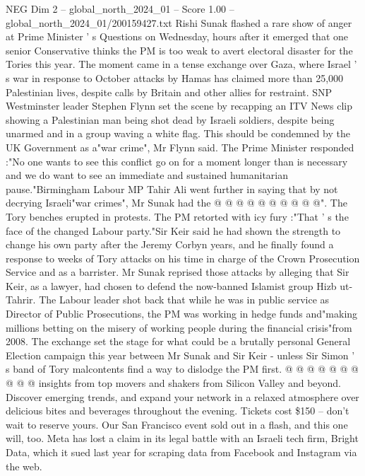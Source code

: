 \begin{textsample}{NEG Dim 2 – global\_north\_2024\_01 – Score 1.00 – global\_north\_2024\_01/200159427.txt}  \label{ex:f2_neg_244}
Rishi Sunak flashed a rare show of anger at Prime Minister ' s Questions on Wednesday, hours after it emerged that one senior Conservative thinks the PM is too weak to avert electoral disaster for the Tories this year.
The moment came in a tense exchange over Gaza, where Israel ' s war in response to October attacks by Hamas has claimed more than 25,000 Palestinian lives, despite calls by Britain and other allies for restraint.
SNP Westminster leader Stephen Flynn set the scene by recapping an ITV News clip showing a Palestinian man being shot dead by Israeli soldiers, despite being unarmed and in a group waving a white flag.
This should be condemned by the UK Government as a"war crime", Mr Flynn said.
The Prime Minister responded :"No one wants to see this conflict go on for a moment longer than is necessary and we do want to see an immediate and sustained humanitarian pause."Birmingham Labour MP Tahir Ali went further in saying that by not decrying Israeli"war crimes", Mr Sunak had the @ @ @ @ @ @ @ @ @ @".
The Tory benches erupted in protests.
The PM retorted with icy fury :"That ' s the face of the changed Labour party."Sir Keir said he had shown the strength to change his own party after the Jeremy Corbyn years, and he finally found a response to weeks of Tory attacks on his time in charge of the Crown Prosecution Service and as a barrister.
Mr Sunak reprised those attacks by alleging that Sir Keir, as a lawyer, had chosen to defend the now-banned Islamist group Hizb ut-Tahrir.
The Labour leader shot back that while he was in public service as Director of Public Prosecutions, the PM was working in hedge funds and"making millions betting on the misery of working people during the financial crisis"from 2008.
The exchange set the stage for what could be a brutally personal General Election campaign this year between Mr Sunak and Sir Keir - unless Sir Simon ' s band of Tory malcontents find a way to dislodge the PM first. @ @ @ @ @ @ @ @ @ @ insights from top movers and shakers from Silicon Valley and beyond.
Discover emerging trends, and expand your network in a relaxed atmosphere over delicious bites and beverages throughout the evening.
Tickets cost \$150 -- don't wait to reserve yours.
Our San Francisco event sold out in a flash, and this one will, too.
Meta has lost a claim in its legal battle with an Israeli tech firm, Bright Data, which it sued last year for scraping data from Facebook and Instagram via the web.

\end{textsample}
